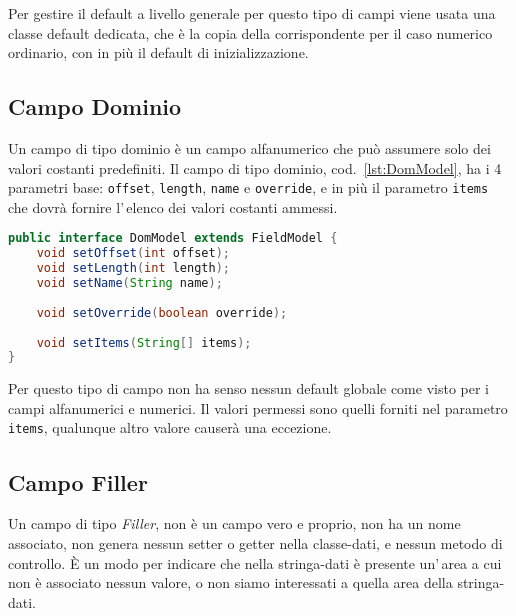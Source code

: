 \documentclass[a4paper,10pt]{report}
\begin{document}
Per gestire il default a livello generale per questo tipo di campi viene usata
una classe default dedicata, che è la copia della corrispondente per il caso
numerico ordinario, con in più il default di inizializzazione.

\subsection{Campo Dominio}
Un campo di tipo dominio è un campo alfanumerico che può assumere solo dei 
valori costanti predefiniti.
Il campo di tipo dominio, cod.~\ref{lst:DomModel}, ha i 4 parametri base: 
\verb!offset!, \verb!length!, \verb!name! e \verb!override!, e in più il 
parametro \verb!items! che dovrà fornire l'\,elenco dei valori costanti ammessi.

\begin{figure*}[!htb]
\begin{lstlisting}[language=java, 
caption=interfaccia DomModel (campo dominio), 
label=lst:DomModel]
public interface DomModel extends FieldModel {
    void setOffset(int offset);
    void setLength(int length);
    void setName(String name);
    
    void setOverride(boolean override);
    
    void setItems(String[] items);
}
\end{lstlisting}
\end{figure*}

Per questo tipo di campo non ha senso nessun default globale come visto per i
campi alfanumerici e numerici. Il valori permessi sono quelli forniti nel 
parametro \verb!items!, qualunque altro valore causerà una eccezione.

\subsection{Campo Filler}
Un campo di tipo \textsl{Filler}, non è un campo vero e proprio, non ha un nome 
associato, non genera nessun setter o getter nella classe-dati, e nessun metodo
di controllo. È un modo per indicare che nella stringa-dati è presente un'\,area
a cui non è associato nessun valore, o non siamo interessati a quella area della
stringa-dati.
\end{document}
